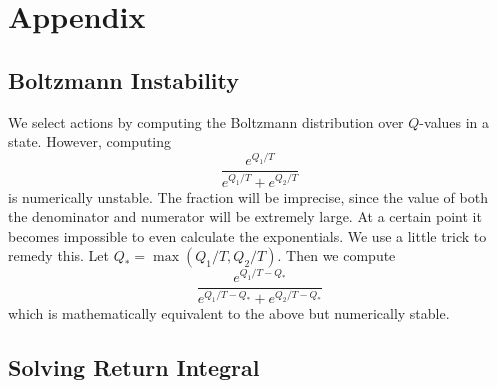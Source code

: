 \label{sec:appendix}
\section{Appendix}
\subsection{Boltzmann Instability}

We select actions by computing the Boltzmann distribution over $Q$-values in a state. However, computing
\[
\frac{e^{Q_1/T}}{e^{Q_1/T} + e^{Q_2 / T}}
\]
is numerically unstable. The fraction will be imprecise, since the value of both the denominator and numerator will be extremely large. At a certain point it becomes impossible to even calculate the exponentials. We use a little trick to remedy this. Let $Q_* = \max(Q_1/T, Q_2/T)$. Then we compute
\[
\frac{e^{Q_1/T - Q_*}}{e^{Q_1/T - Q_*} + e^{Q_2 / T - Q_*}}
\]
which is mathematically equivalent to the above but numerically stable.

\label{sec:solving_integral}
\subsection{Solving Return Integral}


